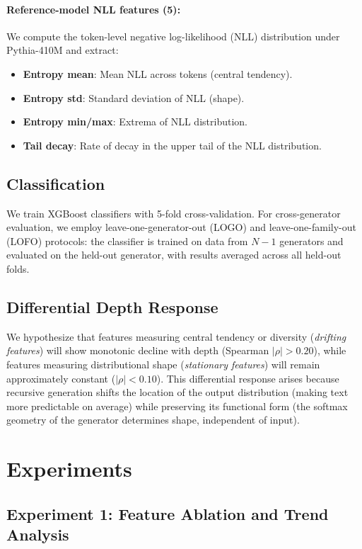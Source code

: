 \documentclass[11pt,a4paper]{article}
\begin{document}
\paragraph{Reference-model NLL features (5):} We compute the token-level negative log-likelihood (NLL) distribution under Pythia-410M and extract:
\begin{itemize}
    \item \textbf{Entropy mean}: Mean NLL across tokens (central tendency).
    \item \textbf{Entropy std}: Standard deviation of NLL (shape).
    \item \textbf{Entropy min/max}: Extrema of NLL distribution.
    \item \textbf{Tail decay}: Rate of decay in the upper tail of the NLL distribution.
\end{itemize}

\subsection{Classification}

We train XGBoost classifiers with 5-fold cross-validation. For cross-generator evaluation, we employ leave-one-generator-out (LOGO) and leave-one-family-out (LOFO) protocols: the classifier is trained on data from $N{-}1$ generators and evaluated on the held-out generator, with results averaged across all held-out folds.

\subsection{Differential Depth Response}

We hypothesize that features measuring central tendency or diversity (\emph{drifting features}) will show monotonic decline with depth (Spearman $|\rho|{>}0.20$), while features measuring distributional shape (\emph{stationary features}) will remain approximately constant ($|\rho|{<}0.10$). This differential response arises because recursive generation shifts the location of the output distribution (making text more predictable on average) while preserving its functional form (the softmax geometry of the generator determines shape, independent of input).

\section{Experiments}

\subsection{Experiment 1: Feature Ablation and Trend Analysis}
\label{sec:exp1}
\end{document}
